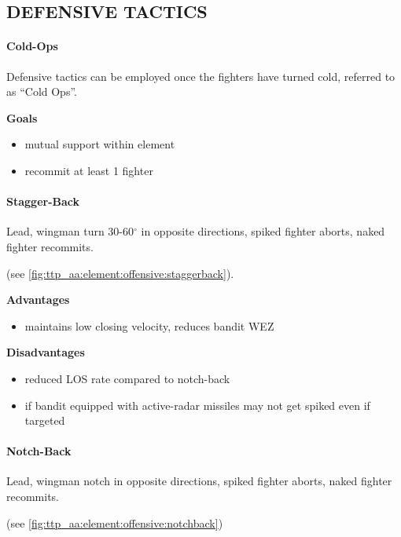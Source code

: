 \subsection{DEFENSIVE TACTICS}

\paragraph{Cold-Ops} 
Defensive tactics can be employed once the fighters have turned cold, 
referred to as ``Cold Ops''.

\medskip
\textbf{Goals}
\begin{itemize}
    \item mutual support within element
    \item recommit at least 1 fighter
\end{itemize}

\paragraph{Stagger-Back}
Lead, wingman turn 30-60$^\circ$ in opposite directions, 
spiked fighter aborts, naked fighter recommits.

\hfill(see \cref{fig:ttp_aa:element:offensive:staggerback}).

\begin{multicols}{2}
    \textbf{Advantages}
    \begin{itemize}
        \item maintains low closing velocity, 
        reduces bandit WEZ
    \end{itemize}
    \vfill\null\columnbreak
    \textbf{Disadvantages}
    \begin{itemize}
        \item reduced LOS rate compared to notch-back
        \item if bandit equipped with active-radar missiles may not get spiked even if targeted
    \end{itemize}
\end{multicols}

\paragraph{Notch-Back}
Lead, wingman notch in opposite directions, 
spiked fighter aborts, naked fighter recommits.

\hfill(see \cref{fig:ttp_aa:element:offensive:notchback})

